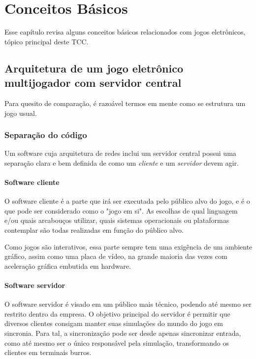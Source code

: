 \chapter{Conceitos Básicos}
\label{sec:conceitos}

Esse capítulo revisa alguns conceitos básicos relacionados com jogos eletrônicos, tópico
principal deste TCC.

\section{Arquitetura de um jogo eletrônico multijogador com servidor central}
\label{sec:conceitos:servidores}
  Para quesito de comparação, é razoável termos em mente como se estrutura um jogo usual.
    
  \subsection{Separação do código}
    Um software cuja arquitetura de redes inclui um servidor central possui uma separação
    clara e bem definida de como um \textit{cliente} e um \textit{servidor} devem agir.
    
    \subsubsection{Software cliente}
      O software cliente é a parte que irá ser executada pelo público alvo do jogo, e é o que
      pode ser considerado como o "jogo em si". As escolhas de qual linguagem e/ou quais arcabouços
      utilizar, quais sistemas operacionais ou plataformas contemplar são todas realizadas em
      função do público alvo.
      
      Como jogos são interativos, essa parte sempre tem uma exigência de um ambiente gráfico,
      assim como uma placa de vídeo, na grande maioria das vezes com aceleração gráfica embutida em
      hardware.
      
    \subsubsection{Software servidor}
      O software servidor é visado em um público mais técnico, podendo até mesmo ser restrito dentro
      da empresa. O objetivo principal do servidor é permitir que diversos clientes consigam manter
      suas simulações do mundo do jogo em sincronia. Para tal, a sincronização pode ser desde apenas
      sincronizar entrada, como até mesmo ser o único responsável pela simulação, transformando os
      clientes em terminais burros.
      
